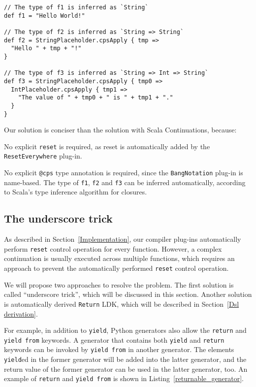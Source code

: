 \begin{lstlisting}[caption={The translated source code of \lstinline{Dsl.scala}-base solution of \lstinline{printf} problem},label={transformed-printf}]
// The type of f1 is inferred as `String`
def f1 = "Hello World!"

// The type of f2 is inferred as `String => String`
def f2 = StringPlaceholder.cpsApply { tmp =>
  "Hello " + tmp + "!"
}

// The type of f3 is inferred as `String => Int => String`
def f3 = StringPlaceholder.cpsApply { tmp0 =>
  IntPlaceholder.cpsApply { tmp1 =>
    "The value of " + tmp0 + " is " + tmp1 + "."
  }
}
\end{lstlisting}

Our solution is conciser than the solution with Scala Continuations, because:
\begin{enumerate*}
  \item No explicit \lstinline{reset} is required, as reset is automatically added by the \lstinline{ResetEverywhere} plug-in.
  \item No explicit \lstinline{@cps} type annotation is required, since the \lstinline{BangNotation} plug-in is name-based. The type of \lstinline{f1}, \lstinline{f2} and \lstinline{f3} can be inferred automatically, according to Scala's type inference algorithm for closures.
\end{enumerate*}

\subsection{The underscore trick}\label{The underscore trick}

As described in Section~\ref{Implementation}, our compiler plug-ins automatically perform \lstinline{reset} control operation for every function. However, a complex continuation is usually executed across multiple functions, which requires an approach to prevent the automatically performed \lstinline{reset} control operation.

We will propose two approaches to resolve the problem. The first solution is called ``underscore trick'', which will be discussed in this section. Another solution is automatically derived \lstinline{Return} LDK, which will be described in Section~\ref{Dsl derivation}.

For example, in addition to \lstinline{yield}, Python generators also allow the \lstinline{return} and \lstinline{yield from} keywords. A generator that contains both \lstinline{yield} and \lstinline{return} keywords can be invoked by \lstinline{yield from} in another generator. The elements \lstinline{yield}ed in the former generator will be added into the latter generator, and the return value of the former generator can be used in the latter generator, too. An example of \lstinline{return} and \lstinline{yield from} is shown in Listing~\ref{returnable_generator}.

